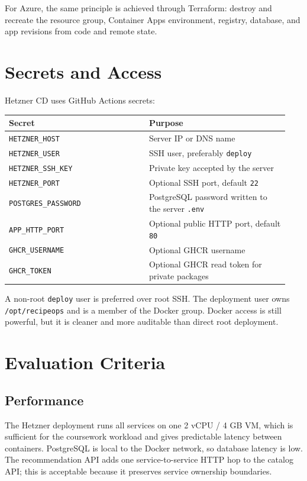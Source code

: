 \documentclass[11pt,a4paper]{article}
\begin{document}
For Azure, the same principle is achieved through Terraform: destroy and recreate the resource group, Container Apps environment, registry, database, and app revisions from code and remote state.

\section{Secrets and Access}

Hetzner CD uses GitHub Actions secrets:

\begin{longtable}{@{}>{\raggedright\arraybackslash}p{0.47\linewidth}>{\raggedright\arraybackslash}p{0.47\linewidth}@{}}
\toprule
\textbf{Secret} & \textbf{Purpose} \\
\midrule
\endhead
\texttt{HETZNER\_HOST} & Server IP or DNS name \\
\texttt{HETZNER\_USER} & SSH user, preferably \texttt{deploy} \\
\texttt{HETZNER\_SSH\_KEY} & Private key accepted by the server \\
\texttt{HETZNER\_PORT} & Optional SSH port, default \texttt{22} \\
\texttt{POSTGRES\_PASSWORD} & PostgreSQL password written to the server \texttt{.env} \\
\texttt{APP\_HTTP\_PORT} & Optional public HTTP port, default \texttt{80} \\
\texttt{GHCR\_USERNAME} & Optional GHCR username \\
\texttt{GHCR\_TOKEN} & Optional GHCR read token for private packages \\
\bottomrule
\end{longtable}

A non-root \texttt{deploy} user is preferred over root SSH. The deployment user owns \texttt{/opt/recipeops} and is a member of the Docker group. Docker access is still powerful, but it is cleaner and more auditable than direct root deployment.

\section{Evaluation Criteria}

\subsection{Performance}

The Hetzner deployment runs all services on one 2 vCPU / 4 GB VM, which is sufficient for the coursework workload and gives predictable latency between containers. PostgreSQL is local to the Docker network, so database latency is low. The recommendation API adds one service-to-service HTTP hop to the catalog API; this is acceptable because it preserves service ownership boundaries.
\end{document}

